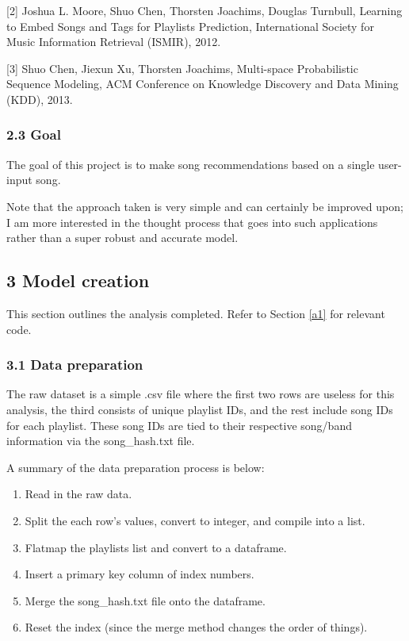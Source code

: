 \documentclass[11pt]{article}
\providecommand{\tightlist}{%
      \setlength{\itemsep}{0pt}\setlength{\parskip}{0pt}}
\begin{document}
{[}2{]} Joshua L. Moore, Shuo Chen, Thorsten Joachims, Douglas Turnbull,
Learning to Embed Songs and Tags for Playlists Prediction, International
Society for Music Information Retrieval (ISMIR), 2012.

{[}3{]} Shuo Chen, Jiexun Xu, Thorsten Joachims, Multi-space
Probabilistic Sequence Modeling, ACM Conference on Knowledge Discovery
and Data Mining (KDD), 2013.

    \subsubsection{2.3 Goal}\label{goal}

    The goal of this project is to make song recommendations based on a
single user-input song.

Note that the approach taken is very simple and can certainly be
improved upon; I am more interested in the thought process that goes
into such applications rather than a super robust and accurate model.

    \subsection{3 Model creation}\label{model-creation}

This section outlines the analysis completed. Refer to Section \ref{a1}
for relevant code.

    \subsubsection{3.1 Data preparation}\label{data-preparation}

    The raw dataset is a simple .csv file where the first two rows are
useless for this analysis, the third consists of unique playlist IDs,
and the rest include song IDs for each playlist. These song IDs are tied
to their respective song/band information via the song\_hash.txt file.

A summary of the data preparation process is below:

\begin{enumerate}
\def\labelenumi{\arabic{enumi}.}
\tightlist
\item
  Read in the raw data.
\item
  Split the each row's values, convert to integer, and compile into a
  list.
\item
  Flatmap the playlists list and convert to a dataframe.
\item
  Insert a primary key column of index numbers.
\item
  Merge the song\_hash.txt file onto the dataframe.
\item
  Reset the index (since the merge method changes the order of things).
\end{enumerate}
\end{document}
